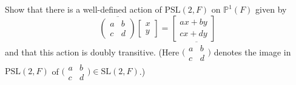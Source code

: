 \documentclass[../Odyssey_Project.tex]{subfiles}
\begin{document}
\begin{exercise}
\label{ex:6.7}
Show that there is a well-defined action of $\mathrm{PSL}(2,F)$ on $\mathbb{P}^1(F)$ given by
\[
\overline{\begin{pmatrix}a & b\\ c & d\end{pmatrix}} \begin{bmatrix}x\\ y\end{bmatrix} = \begin{bmatrix}ax+by\\ cx+dy\end{bmatrix}
\]
and that this action is doubly transitive. (Here $\overline{\bigl(\begin{smallmatrix}a & b\\ c & d\end{smallmatrix}\bigr)}$ denotes the image in $\mathrm{PSL}(2,F)$ of $\bigl(\begin{smallmatrix}a & b\\ c & d\end{smallmatrix}\bigr) \in \mathrm{SL}(2,F)$.)
\end{exercise}
\end{document}
